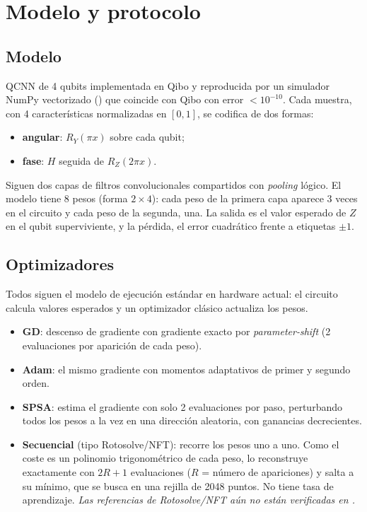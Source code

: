 \documentclass[11pt,a4paper]{article}
\begin{document}
\section{Modelo y protocolo}

\subsection{Modelo}
QCNN de 4 qubits implementada en Qibo y reproducida por un simulador NumPy vectorizado
() que coincide con Qibo con error $<10^{-10}$. Cada muestra, con 4 características
normalizadas en $[0,1]$, se codifica de dos formas:
\begin{itemize}
  \item \textbf{angular}: $R_Y(\pi x)$ sobre cada qubit;
  \item \textbf{fase}: $H$ seguida de $R_Z(2\pi x)$.
\end{itemize}
Siguen dos capas de filtros convolucionales compartidos con \textit{pooling} lógico. El modelo tiene 8 pesos
(forma $2\times 4$): cada peso de la primera capa aparece 3 veces en el circuito y cada peso de la segunda, una.
La salida es el valor esperado de $Z$ en el qubit superviviente, y la pérdida, el error cuadrático frente a
etiquetas $\pm 1$.

\subsection{Optimizadores}
Todos siguen el modelo de ejecución estándar en hardware actual: el circuito calcula valores esperados y un
optimizador clásico actualiza los pesos.
\begin{itemize}
  \item \textbf{GD}: descenso de gradiente con gradiente exacto por \textit{parameter-shift} (2 evaluaciones por
        aparición de cada peso).
  \item \textbf{Adam}: el mismo gradiente con momentos adaptativos de primer y segundo orden.
  \item \textbf{SPSA}: estima el gradiente con solo 2 evaluaciones por paso, perturbando todos los pesos a la vez en
        una dirección aleatoria, con ganancias decrecientes.
  \item \textbf{Secuencial} (tipo Rotosolve/NFT): recorre los pesos uno a uno. Como el coste es un polinomio
        trigonométrico de cada peso, lo reconstruye exactamente con $2R+1$ evaluaciones ($R$ = número de apariciones)
        y salta a su mínimo, que se busca en una rejilla de 2048 puntos. No tiene tasa de aprendizaje.
        \textit{Las referencias de Rotosolve/NFT aún no están verificadas en .}
\end{itemize}
\end{document}
